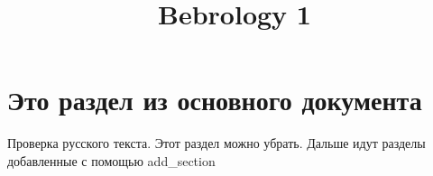 \documentclass[14pt]{extarticle}%
\title{Bebrology 1}%
\begin{document}
%
\normalsize%
\maketitle%
\section{Это раздел из основного документа}%
\label{sec:}%
Проверка русского текста. Этот раздел можно убрать. %
Дальше идут разделы добавленные с помощью add\_section

%
%
%
\end{document}
